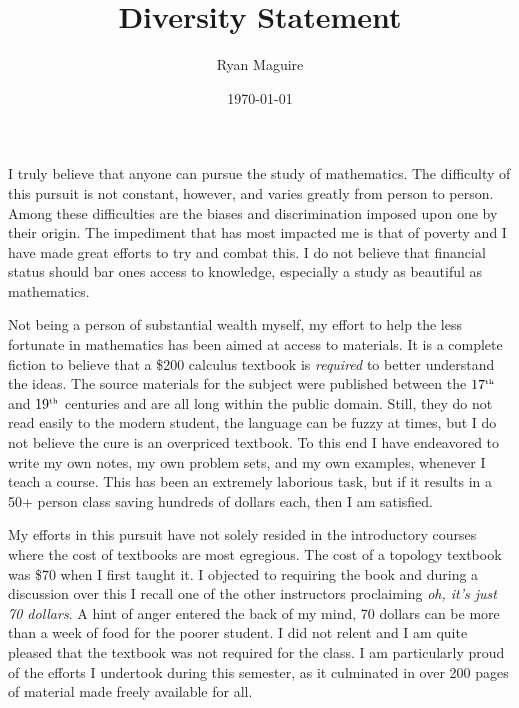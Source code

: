 \documentclass{article}
\title{Diversity Statement}
\author{Ryan Maguire}
\date{\today}
\begin{document}
    \maketitle
    I truly believe that anyone can pursue the study of mathematics. The
    difficulty of this pursuit is not constant, however, and varies greatly
    from person to person. Among these difficulties are the biases and
    discrimination imposed upon one by their origin. The impediment that
    has most impacted me is that of poverty and I have made great efforts to
    try and combat this. I do not believe that financial status should bar ones
    access to knowledge, especially a study as beautiful as mathematics.
    \par\hfill\par
    Not being a person of substantial wealth myself, my effort to help the
    less fortunate in mathematics has been aimed at access to materials.
    It is a complete fiction to believe that a \$200 calculus textbook is
    \textit{required} to better understand the ideas. The source materials for
    the subject were published between the
    $17^{\textrm{\tiny{th}}}$ and $19^{\textrm{\tiny{th}}}$ centuries and
    are all long within the public domain. Still, they do not read easily to
    the modern student, the language can be fuzzy at times, but I do not believe
    the cure is an overpriced textbook. To this end I have endeavored
    to write my own notes, my own problem sets, and my own examples,
    whenever I teach a course. This has been an extremely laborious task,
    but if it results in a 50+ person class saving hundreds of dollars each,
    then I am satisfied.
    \par\hfill\par
    My efforts in this pursuit have not solely resided in the introductory
    courses where the cost of textbooks are most egregious. The cost of a
    topology textbook was \$70 when I first taught it. I objected to requiring
    the book and during a discussion over this I recall one of the other
    instructors proclaiming \textit{oh, it's just 70 dollars}. A hint of anger
    entered the back of my mind, 70 dollars can be more than a week of food for
    the poorer student. I did not relent and I am quite pleased that the
    textbook was not required for the class. I am particularly proud of the
    efforts I undertook during this semester, as it culminated in over 200 pages
    of material made freely available for all.
\end{document}

